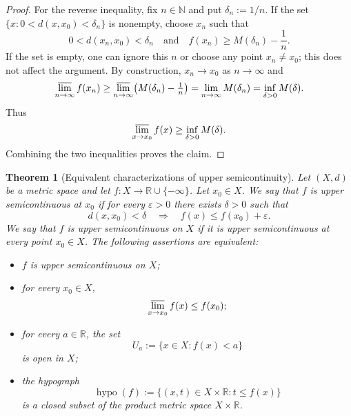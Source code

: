 \documentclass[12pt]{article}
\renewcommand{\(}{\left(}%
\renewcommand{\)}{\right)}%
\renewcommand{\[}{\left[}%
\renewcommand{\]}{\right]}%
\newtheorem{theorem}{Theorem}[section]}
\newtheorem{proof}{Proof.}}
\begin{document}
\begin{proof}
For the reverse inequality, fix $n \in \mathbb{N}$ and put
$\delta_n := 1/n$.
If the set $\{x : 0<d(x,x_0)<\delta_n\}$ is nonempty, choose
$x_n$ such that
\begin{equation*}
0 < d(x_n,x_0) < \delta_n
\quad\text{and}\quad
f(x_n) \geq M(\delta_n) - \frac{1}{n}.
\end{equation*}
If the set is empty, one can ignore this $n$ or choose any point
$x_n \neq x_0$; this does not affect the argument.
By construction, $x_n \to x_0$ as $n\to\infty$ and
\begin{equation*}
\varlimsup_{n\to\infty} f(x_n)
\geq
\varlimsup_{n\to\infty} \bigl(M(\delta_n) - \tfrac{1}{n}\bigr)
=
\lim_{n\to\infty} M(\delta_n)
=
\inf_{\delta>0} M(\delta).
\end{equation*}
Thus
\begin{equation*}
\varlimsup_{x \to x_0} f(x)
\geq
\inf_{\delta>0} M(\delta).
\end{equation*}
Combining the two inequalities proves the claim.
\end{proof}




\begin{theorem}[Equivalent characterizations of upper semicontinuity]
\label{thm:usc-equivalences}
Let $(X,d)$ be a metric space and let $f : X \to \mathbb{R} \cup \{-\infty\}$.
Let $x_0 \in X$. We say that $f$ is \emph{upper semicontinuous at $x_0$} if
for every $\varepsilon > 0$ there exists $\delta > 0$ such that
\begin{equation*}
d(x,x_0) < \delta
\quad\Longrightarrow\quad
f(x) \leq f(x_0) + \varepsilon.
\end{equation*}
We say that $f$ is \emph{upper semicontinuous} on $X$ if it is upper
semicontinuous at every point $x_0 \in X$.
The following assertions are equivalent:
\begin{itemize}
  \item[(1)] $f$ is upper semicontinuous on $X$;
  \item[(2)] for every $x_0 \in X$,
  \begin{equation*}
  \varlimsup_{x\to x_0} f(x) \leq f(x_0);
  \end{equation*}
  \item[(3)] for every $a \in \mathbb{R}$, the set
  \begin{equation*}
  U_a := \{x \in X : f(x) < a\}
  \end{equation*}
  is open in $X$;
  \item[(4)] the hypograph
  \begin{equation*}
  \operatorname{hypo}(f)
  :=
  \{(x,t) \in X \times \mathbb{R} : t \leq f(x)\}
  \end{equation*}
  is a closed subset of the product metric space $X \times \mathbb{R}$.
\end{itemize}
\end{theorem}
\end{document}
